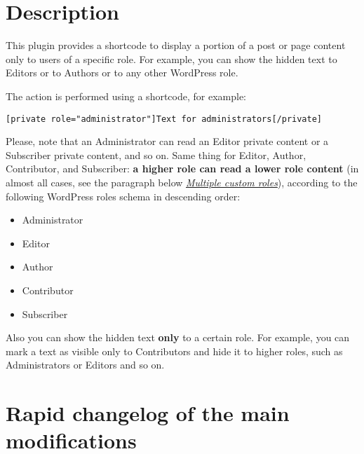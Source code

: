 \documentclass[a4paper,10pt]{article}
\begin{document}
\section{Description}

This plugin provides a shortcode to display a portion of a post or page content only to users of a specific role. For example, you can show the hidden text to Editors or to Authors or to any other WordPress role.

The action is performed using a shortcode, for example:

\begin{lstlisting}
[private role="administrator"]Text for administrators[/private]
\end{lstlisting}

Please, note that an Administrator can read an Editor private content or a Subscriber private content, and so on. Same thing for Editor, Author, Contributor, and Subscriber: \textbf{a higher role can read a lower role content} (in almost all cases, see the paragraph below \textit{\hyperref[multiple-custom-roles]{Multiple custom roles}}), according to the following WordPress roles schema in descending order:

\begin{itemize}
 \item Administrator
 \item Editor
 \item Author
 \item Contributor
 \item Subscriber
\end{itemize}

Also you can show the hidden text \textbf{only} to a certain role. For example, you can mark a text as visible only to Contributors and hide it to higher roles, such as Administrators or Editors and so on.

\section{Rapid changelog of the main modifications}
\end{document}
